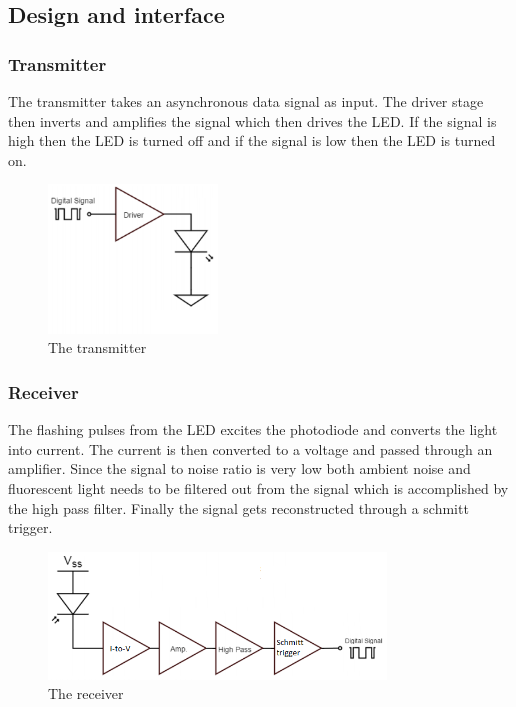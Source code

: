 \subsection{Design and interface}
\subsubsection{Transmitter}

The transmitter takes an asynchronous data signal as input. The driver stage then inverts and amplifies the signal which then drives the LED. If the signal is high then the LED is turned off and if the signal is low then the LED is turned on.

\begin{figure}[h]
\centering
\includegraphics[width=0.4\textwidth]{trans}
\caption{The transmitter}
\label{fig:trans}
\end{figure}

\subsubsection{Receiver}
The flashing pulses from the LED excites the photodiode and converts the light into current. The current is then converted to a voltage and passed through an amplifier. Since the signal to noise ratio is very low both ambient noise and fluorescent light needs to be filtered out from the signal which is accomplished by the high pass filter. Finally the signal gets reconstructed through a schmitt trigger.

\begin{figure}[h]
\centering
\includegraphics[width=0.8\textwidth]{rec}
\caption{The receiver}
\label{fig:rec}
\end{figure}
